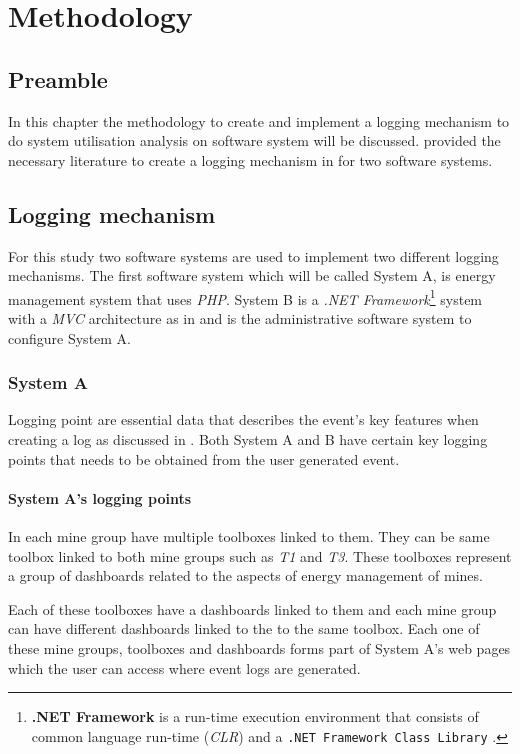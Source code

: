 \chapter{Methodology}
\label{chap:2}

\section{Preamble}
In this chapter the methodology to create and implement a logging mechanism to do system utilisation analysis on software system will be discussed.  provided the necessary literature to create a logging mechanism in  for two software systems.

\section{Logging mechanism}\label{sec:Ch3_LoggingMechanism}
For this study two software systems are used to implement two different logging mechanisms. The first software system which will be called System A, is energy management system that uses \emph{PHP}. System B is a \emph{.NET Framework}\footnote{\label{ftn:NetFramework}\textbf{.NET Framework} is a run-time execution environment that consists of common language run-time (\emph{CLR}) and a \texttt{.NET Framework Class Library} \cite{Harkness2007}.} system with a \emph{MVC} architecture as in  and is the administrative software system to configure System A.

\clearpage

\subsection{System A}
Logging point are essential data that describes the event's key features when creating a log as discussed in . Both System A and B have certain key logging points that needs to be obtained from the user generated event.

\subsubsection{System A's logging points}\label{sec:SystemA_LoggingPoints}
In  each mine group have multiple toolboxes linked to them. They can be same toolbox linked to both mine groups such as \emph{T1} and \emph{T3}. These toolboxes represent a group of dashboards related to the aspects of energy management of mines.\par Each of these toolboxes have a dashboards linked to them and each mine group can have different dashboards linked to the to the same toolbox. Each one of these mine groups, toolboxes and dashboards forms part of System A's web pages which the user can access where event logs are generated.

